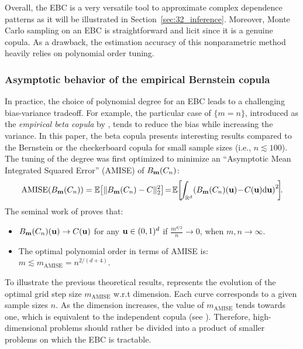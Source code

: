 Overall, the EBC is a very versatile tool to approximate complex dependence patterns as it will be illustrated in Section~\ref{sec:32_inference}. 
Moreover, Monte Carlo sampling on an EBC is straightforward and licit since it is a genuine copula. 
As a drawback, the estimation accuracy of this nonparametric method heavily relies on polynomial order tuning.   


\subsubsection{Asymptotic behavior of the empirical Bernstein copula}
In practice, the choice of polynomial degree for an EBC leads to a challenging bias-variance tradeoff. 
For example, the particular case of $\{m = n\}$, introduced as the \textit{empirical beta copula} by \cite{segers_2017}, tends to reduce the bias while increasing the variance. 
In this paper, the beta copula presents interesting results compared to the Bernstein or the checkerboard copula for small sample sizes (i.e., $n\lesssim100$). 
The tuning of the degree was first optimized to minimize an ``Asymptotic Mean Integrated Squared Error'' (AMISE) of $B_{{\bf m}}(C_n)$: 
\begin{equation}
    \mathrm{AMISE}(B_{\bm}(C_n)) = \E\!\left[ \lVert B_{\bm}(C_n) - C \rVert^2_2 \right] \!=\! \E\!\left[\!\int_{\R^d}\! \left(B_{\bm}(C_n)(\bu) \!-\! C(\bu) \dd \bu \right)^2 \!\right]\!\!.
    \label{eq:aimse}
\end{equation}
The seminal work of \citet[Theorem 3]{sancetta_satchell_2004} proves that: 
\begin{itemize}
    \item $B_{{\bf m}}(C_n)({\bf u}) \rightarrow C({\bf u})$ for any ${\bf u} \in (0, 1)^d$ if $\frac{m^{d/2}}{n} \rightarrow 0$, when $m, n \rightarrow \infty$.
    \item The optimal polynomial order in terms of AMISE is\footnotemark: $m \lesssim m_{\mathrm{AMISE}} = n^{2/(d+4)}$.    
\end{itemize}
To illustrate the previous theoretical results,  represents the evolution of the optimal grid step size $m_{\mathrm{AMISE}}$ w.r.t dimension. 
Each curve corresponds to a given sample sizes $n$. 
As the dimension increases, the value of $m_{\mathrm{AMISE}}$ tends towards one, which is equivalent to the independent copula (see \citealp[p. 117]{lasserre_2022}). 
Therefore, high-dimensional problems should rather be divided into a product of smaller problems on which the EBC is tractable.

